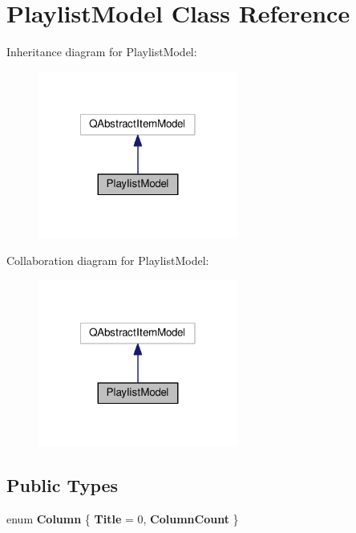 \hypertarget{class_playlist_model}{\section{Playlist\-Model Class Reference}
\label{class_playlist_model}
}


Inheritance diagram for Playlist\-Model\-:
\nopagebreak
\begin{figure}[H]
\begin{center}
\leavevmode
\includegraphics[width=186pt]{class_playlist_model__inherit__graph}
\end{center}
\end{figure}


Collaboration diagram for Playlist\-Model\-:
\nopagebreak
\begin{figure}[H]
\begin{center}
\leavevmode
\includegraphics[width=186pt]{class_playlist_model__coll__graph}
\end{center}
\end{figure}
\subsection*{Public Types}
\begin{DoxyCompactItemize}
\item 
enum {\bfseries Column} \{ {\bfseries Title} = 0, 
{\bfseries Column\-Count}
 \}
\end{DoxyCompactItemize}
